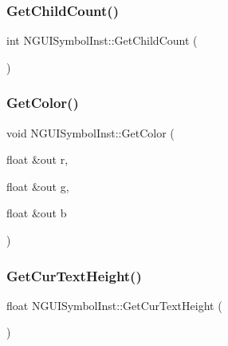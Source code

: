 \hypertarget{class_n_g_u_i_symbol_inst_a26b80186c9b979b766a7f54119f070e7}{}\label{class_n_g_u_i_symbol_inst_a26b80186c9b979b766a7f54119f070e7} 
\subsubsection{\texorpdfstring{Get\+Child\+Count()}{GetChildCount()}}
{\footnotesize\ttfamily int N\+G\+U\+I\+Symbol\+Inst\+::\+Get\+Child\+Count (\begin{DoxyParamCaption}{ }\end{DoxyParamCaption})}

\hypertarget{class_n_g_u_i_symbol_inst_a02d522637f50d01175f39599d9551d46}{}\label{class_n_g_u_i_symbol_inst_a02d522637f50d01175f39599d9551d46} 
\subsubsection{\texorpdfstring{Get\+Color()}{GetColor()}}
{\footnotesize\ttfamily void N\+G\+U\+I\+Symbol\+Inst\+::\+Get\+Color (\begin{DoxyParamCaption}\item[{float \&out}]{r,  }\item[{float \&out}]{g,  }\item[{float \&out}]{b }\end{DoxyParamCaption})}

\hypertarget{class_n_g_u_i_symbol_inst_a7db23b1e1e65782f641edf92dd17507b}{}\label{class_n_g_u_i_symbol_inst_a7db23b1e1e65782f641edf92dd17507b} 
\subsubsection{\texorpdfstring{Get\+Cur\+Text\+Height()}{GetCurTextHeight()}}
{\footnotesize\ttfamily float N\+G\+U\+I\+Symbol\+Inst\+::\+Get\+Cur\+Text\+Height (\begin{DoxyParamCaption}{ }\end{DoxyParamCaption})}

